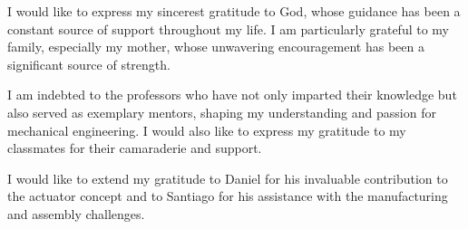 \par I would like to express my sincerest gratitude to God, whose guidance has been a constant source of support throughout my life. I am particularly grateful to my family, especially my mother, whose unwavering encouragement has been a significant source of strength.
\par I am indebted to the professors who have not only imparted their knowledge but also served as exemplary mentors, shaping my understanding and passion for mechanical engineering. I would also like to express my gratitude to my classmates for their camaraderie and support. \par I would like to extend my gratitude to Daniel for his invaluable contribution to the actuator concept and to Santiago for his assistance with the manufacturing and assembly challenges.